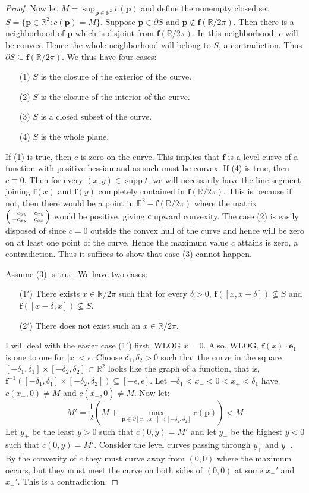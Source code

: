 \documentclass{amsart}
\newcommand{\R}			{\mathbb R}
\newcommand{\f}			{\mathbf f}
\newcommand{\p}			{\mathbf p}
\newcommand{\e}			{\mathbf e}
\newcommand{\cross}		{\times}
\numberwithin{equation}{section}
\begin{document}
\begin{proof}
Now let $M=\sup_{\p\in\R^2}c(\p)$ and define the nonempty 
closed set $S=\{\p\in\R^2:c(\p)=M\}$.  
Suppose $\p\in\partial S$ and $\p\notin\f(\R/2\pi)$.  
Then there is a neighborhood of $\p$ which is disjoint 
from $\f(\R/2\pi)$.  In this neighborhood, $c$ will 
be convex.  Hence the whole neighborhood will belong 
to $S$, a contradiction.  Thus 
$\partial S\subseteq\f(\R/2\pi)$.  We thus have four 
cases:
\begin{itemize}
\item[(1)] $S$ is the closure of the exterior of the curve.
\item[(2)] $S$ is the closure of the interior of the curve.
\item[(3)] $S$ is a closed subset of the curve.
\item[(4)] $S$ is the whole plane.
\end{itemize}
If (1) is true, then $c$ is zero on the curve.  This 
implies that $\f$ is a level curve of a function with positive 
hessian and as such must be convex.  If (4) is true, 
then $c\equiv 0$.  Then for every $(x,y)\in\operatorname{supp}t$, 
we will necessarily have the line segment joining 
$\f(x)$ and $\f(y)$ completely contained in $\f(\R/2\pi)$.  
This is because if not, then there would be a point 
in $\R^2-\f(\R/2\pi)$ where the matrix
$\left(\begin{smallmatrix}\hfill c_{yy}&-c_{xy}\cr
-c_{xy}&\hfill c_{xx}\end{smallmatrix}\right)$ would be 
positive, giving $c$ upward convexity.  The case (2) is 
easily disposed of since $c=0$ outside the convex hull 
of the curve and hence will be zero on 
at least one point of the curve.  Hence the maximum 
value $c$ attains is zero, a contradiction.  Thus it 
suffices to show that case (3) cannot happen.

Assume (3) is true.  We have two cases:
\begin{itemize}
\item[(1$'$)] There exists $x\in\R/2\pi$ such that for every 
$\delta>0$, $\f([x,x+\delta])\nsubseteq S$ and $\f([x-\delta,x])\nsubseteq S$.
\item[(2$'$)] There does not exist such an $x\in\R/2\pi$.
\end{itemize}
I will deal with the easier case (1$'$) first.  WLOG $x=0$.  
Also, WLOG, $\f(x)\cdot\e_1$ is one to one for $|x|<\epsilon$.  
Choose $\delta_1,\delta_2>0$ such that the curve in the square 
$[-\delta_1,\delta_1]\cross[-\delta_2,\delta_2]\subset\R^2$ looks like the graph of 
a function, that is, $\f^{-1}([-\delta_1,\delta_1]\cross[-\delta_2,\delta_2])\subseteq[-\epsilon,\epsilon]$.  
Let $-\delta_1<x_-<0<x_+<\delta_1$ have $c(x_-,0)\ne M$ and 
$c(x_+,0)\ne M$.
Now let:
\begin{equation}
M'=\frac 12\left(M+\max_{\p\in\partial[x_-,x_+]\cross[-\delta_2,\delta_2]}c(\p)\right)<M
\end{equation}
Let $y_+$ be the least $y>0$ such that $c(0,y)=M'$ and let 
$y_-$ be the highest $y<0$ such that $c(0,y)=M'$.  Consider 
the level curves passing through $y_+$ and $y_-$.  By the 
convexity of $c$ they must curve away from $(0,0)$ where 
the maximum occurs, but they must meet the curve on both 
sides of $(0,0)$ at some $x_-'$ and $x_+'$.  This is a 
contradiction.


\end{proof}
\end{document}
